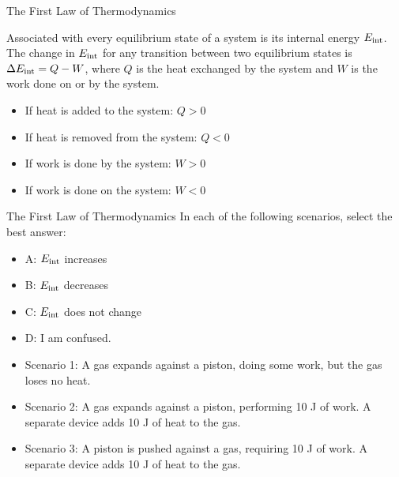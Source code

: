 \documentclass{beamer}
\begin{document}
\begin{frame}{The First Law of Thermodynamics}
\begin{tcolorbox}[colback=white,colframe=red!40!blue,title=The First Law of Thermodynamics]
\alert{Associated with every equilibrium state of a system is its internal energy $E_{\rm int}$.  The change in $E_{\rm int}$ for any transition between two equilibrium states is $\Delta E_{\rm int} = Q-W$, where $Q$ is the heat exchanged by the system and $W$ is the work done on or by the system.}
\end{tcolorbox}
\begin{itemize}
\item If heat is added to the system: $Q>0$
\item If heat is removed from the system: $Q<0$
\item If work is done by the system: $W>0$
\item If work is done on the system: $W<0$
\end{itemize}
\end{frame}

\begin{frame}{The First Law of Thermodynamics}
In each of the following scenarios, select the best answer:
\small
\begin{itemize}
\item A: $E_{\rm int}$ increases
\item B: $E_{\rm int}$ decreases
\item C: $E_{\rm int}$ does not change
\item D: I am confused.
\end{itemize}
\small
\begin{itemize}
\item Scenario 1: \alert{A gas expands against a piston, doing some work, but the gas loses no heat.}
\item Scenario 2: A gas expands against a piston, performing 10 J of work.  A separate device adds 10 J of heat to the gas.
\item Scenario 3: A piston is pushed against a gas, requiring 10 J of work.  A separate device adds 10 J of heat to the gas.
\end{itemize}
\end{frame}
\end{document}
